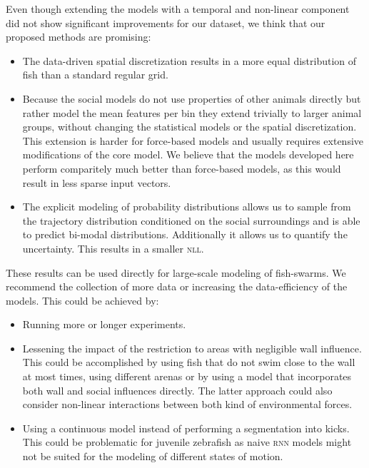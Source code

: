 \documentclass[nobib, a4paper]{tufte-handout}
\begin{document}
Even though extending the models with a temporal and non-linear component did not show significant improvements for our dataset, we think that our proposed methods are promising:
\begin{itemize}
\item The data-driven spatial discretization results in a more equal distribution of fish than a standard regular grid.
\item Because the social models do not use properties of other animals directly but rather model the mean features per bin they extend trivially to larger animal groups, without changing the statistical models or the spatial discretization.
  This extension is harder for force-based models and usually requires extensive modifications of the core model.
  We believe that the models developed here perform comparitely much better than force-based models, as this would result in less sparse input vectors.
\item The explicit modeling of probability distributions allows us to sample from the trajectory distribution conditioned on the social surroundings and is able to predict bi-modal distributions.
  Additionally it allows us to quantify the uncertainty.
  This results in a smaller \textsc{nll}.
\end{itemize}
These results can be used directly for large-scale modeling of fish-swarms.
We recommend the collection of more data or increasing the data-efficiency of the models.
This could be achieved by:
\begin{itemize}
\item Running more or longer experiments.
\item Lessening the impact of the restriction to areas with negligible wall influence.
  This could be accomplished by using fish that do not swim close to the wall at most times, using different arenas or by using a model that incorporates both wall and social influences directly.
  The latter approach could also consider non-linear interactions between both kind of environmental forces.
\item Using a continuous model instead of performing a segmentation into kicks.
  This could be problematic for juvenile zebrafish as naive \textsc{rnn} models might not be suited for the modeling of different states of motion.
\end{itemize}

\printbibliography
\end{document}
